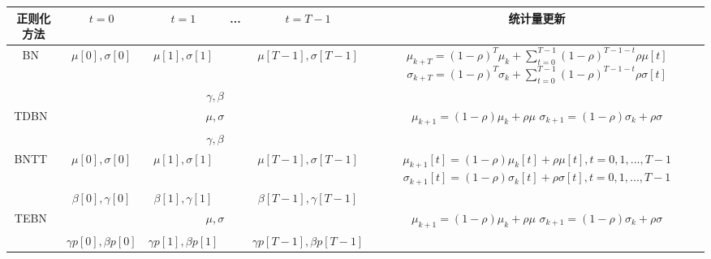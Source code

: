 \documentclass{SCIS2020cn}
\begin{document}
\begin{table}
\label{tab: bn methods}
\footnotesize
\tabcolsep 6pt %
\begin{tabular*}{\textwidth}{cccccc}
\toprule
\hline
正则化方法                      & $t=0$        & $t=1$        & ... & $t=T-1$ &  统计量更新     \\ \hline
\multirow{2}{*}{BN~\cite{ioffe2015batch}}   & $\mu[0],\sigma[0]$   & $\mu[1],\sigma[1]$   & &$\mu[T-1],\sigma[T-1]$      & \makecell[c]{$\mu_{k+T} = (1-\rho)^{T}\mu_{k} + \sum_{t=0}^{T-1}(1-\rho)^{T-1-t}\rho\mu[t]$\\$\sigma_{k+T} = (1-\rho)^{T}\sigma_{k} + \sum_{t=0}^{T-1}(1-\rho)^{T-1-t}\rho\sigma[t]$}  \\ \cline{2-6} 
                      & \multicolumn{4}{c}{$\gamma, \beta$}              \\ \hline
\multirow{2}{*}{TDBN~\cite{zheng2020going}} & \multicolumn{4}{c}{$\mu, \sigma$}  & \makecell[c]{$\mu_{k+1} = (1 - \rho)\mu_{k} + \rho\mu$ \\ $\sigma_{k+1} = (1 - \rho)\sigma_{k} + \rho\sigma$ }           \\ \cline{2-6} 
                      & \multicolumn{4}{c}{$\gamma, \beta$}             \\ \hline
\multirow{2}{*}{BNTT~\cite{10.3389/fnins.2021.773954}} & $\mu[0],\sigma[0]$   & $\mu[1],\sigma[1]$   &     & $\mu[T-1],\sigma[T-1]$ & \makecell[c]{$\mu_{k+1}[t] = (1 - \rho)\mu_{k}[t] + \rho\mu[t], t=0,1,...,T-1$ \\ $\sigma_{k+1}[t] = (1 - \rho)\sigma_{k}[t] + \rho\sigma[t], t=0,1,...,T-1$ }    \\ \cline{2-6} 
                      & $\beta[0], \gamma[0]$ & $\beta[1], \gamma[1]$ &     & $\beta[T-1], \gamma[T-1]$ &  \\ \hline
\multirow{2}{*}{TEBN~\cite{duan2022temporal}} & \multicolumn{4}{c}{$\mu, \sigma$}  & \makecell[c]{$\mu_{k+1} = (1 - \rho)\mu_{k} + \rho\mu$ \\ $\sigma_{k+1} = (1 - \rho)\sigma_{k} + \rho\sigma$ }              \\ \cline{2-6} 
                      & $\gamma p[0], \beta p[0]$ & $\gamma p[1], \beta p[1]$ &     & $\gamma p[T-1], \beta p[T-1]$ & \\ \hline
\bottomrule
\end{tabular*}
\end{table}
\end{document}
